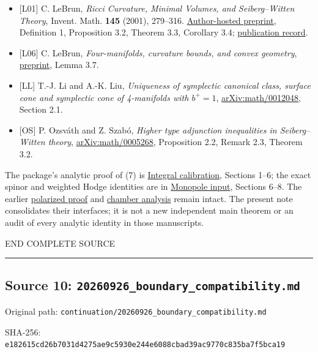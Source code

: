 \documentclass[
  10pt,
]{article}
\providecommand{\tightlist}{%
  \setlength{\itemsep}{0pt}\setlength{\parskip}{0pt}}
\begin{document}
\begin{itemize}
\tightlist
\item
  {[}L01{]} C. LeBrun, \emph{Ricci Curvature, Minimal Volumes, and
  Seiberg--Witten Theory}, Invent. Math. \textbf{145} (2001), 279--316.
  \href{https://www.math.stonybrook.edu/~claude/min.pdf}{Author-hosted
  preprint}, Definition 1, Proposition 3.2, Theorem 3.3, Corollary 3.4;
  \href{https://doi.org/10.1007/s002220100148}{publication record}.
\item
  {[}L06{]} C. LeBrun, \emph{Four-manifolds, curvature bounds, and
  convex geometry}, \href{https://arxiv.org/abs/math/0611450}{preprint},
  Lemma 3.7.
\item
  {[}LL{]} T.-J. Li and A.-K. Liu, \emph{Uniqueness of symplectic
  canonical class, surface cone and symplectic cone of 4-manifolds with
  \(b^+=1\)},
  \href{https://arxiv.org/abs/math/0012048}{arXiv:math/0012048}, Section
  2.1.
\item
  {[}OS{]} P. Ozsváth and Z. Szabó, \emph{Higher type adjunction
  inequalities in Seiberg--Witten theory},
  \href{https://arxiv.org/abs/math/0005268}{arXiv:math/0005268},
  Proposition 2.2, Remark 2.3, Theorem 3.2.
\end{itemize}

The package's analytic proof of (7) is
\href{round4_rigidity.md}{Integral calibration}, Sections 1--6; the
exact spinor and weighted Hodge identities are in
\href{round3_monopole_input.md}{Monopole input}, Sections 6--8. The
earlier \href{round13_chamber.md}{polarized proof} and
\href{round21_chambers.md}{chamber analysis} remain intact. The present
note consolidates their interfaces; it is not a new independent main
theorem or an audit of every analytic identity in those manuscripts.

END COMPLETE SOURCE

\begin{center}\rule{0.5\linewidth}{0.5pt}\end{center}

\hypertarget{source-10-20260926_boundary_compatibility.md}{%
\subsection{Source 10:
\nolinkurl{20260926_boundary_compatibility.md}}\label{source-10-20260926_boundary_compatibility.md}}

Original path:
\nolinkurl{continuation/20260926_boundary_compatibility.md}

SHA-256:
\nolinkurl{e182615cd26b7031d4275ae9c5930e244e6088cbad39ac9770c835ba7f5bca19}
\end{document}
